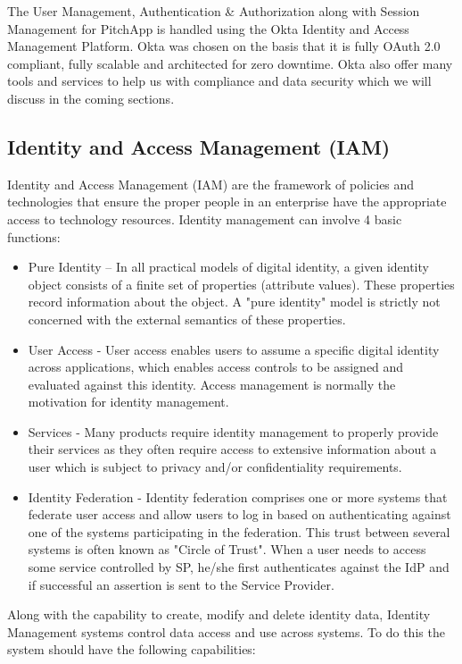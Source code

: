 The User Management, Authentication \& Authorization along with Session Management for PitchApp is handled using the Okta Identity and Access Management Platform. Okta was chosen on the basis that it is fully OAuth 2.0 compliant, fully scalable and architected for zero downtime. Okta also offer many tools and services to help us with compliance and data security which we will discuss in the coming sections.

\subsection{Identity and Access Management (IAM)}

Identity and Access Management (IAM) are the framework of policies and technologies that ensure the proper people in an enterprise have the appropriate access to technology resources. Identity management can involve 4 basic functions:

\begin{itemize}
	\item Pure Identity – In all practical models of digital identity, a given identity object consists of a finite set of properties (attribute values). These properties record information about the object. A "pure identity" model is strictly not concerned with the external semantics of these properties.
	\item User Access - User access enables users to assume a specific digital identity across applications, which enables access controls to be assigned and evaluated against this identity. Access management is normally the motivation for identity management.
	\item Services - Many products require identity management to properly provide their services as they often require access to extensive information about a user which is subject to privacy and/or confidentiality requirements.
	\item Identity Federation - Identity federation comprises one or more systems that federate user access and allow users to log in based on authenticating against one of the systems participating in the federation. This trust between several systems is often known as "Circle of Trust". When a user needs to access some service controlled by SP, he/she first authenticates against the IdP and if successful an assertion is sent to the Service Provider.
\end{itemize}

Along with the capability to create, modify and delete identity data, Identity Management systems control data access and use across systems. To do this the system should have the following capabilities:


